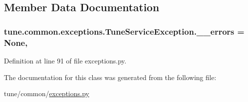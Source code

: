 \subsection{Member Data Documentation}
\hypertarget{classtune_1_1common_1_1exceptions_1_1TuneServiceException_af7c571cf3406ac91701b8227b6cf261c}{
\subsubsection[{\-\_\-\-\_\-errors}]{\setlength{\rightskip}{0pt plus 5cm}tune.\-common.\-exceptions.\-Tune\-Service\-Exception.\-\_\-\-\_\-errors = None\hspace{0.3cm}{\ttfamily [static]}, {\ttfamily [private]}}}\label{classtune_1_1common_1_1exceptions_1_1TuneServiceException_af7c571cf3406ac91701b8227b6cf261c}


Definition at line 91 of file exceptions.\-py.



The documentation for this class was generated from the following file\-:\begin{DoxyCompactItemize}
\item 
tune/common/\hyperlink{exceptions_8py}{exceptions.\-py}\end{DoxyCompactItemize}
